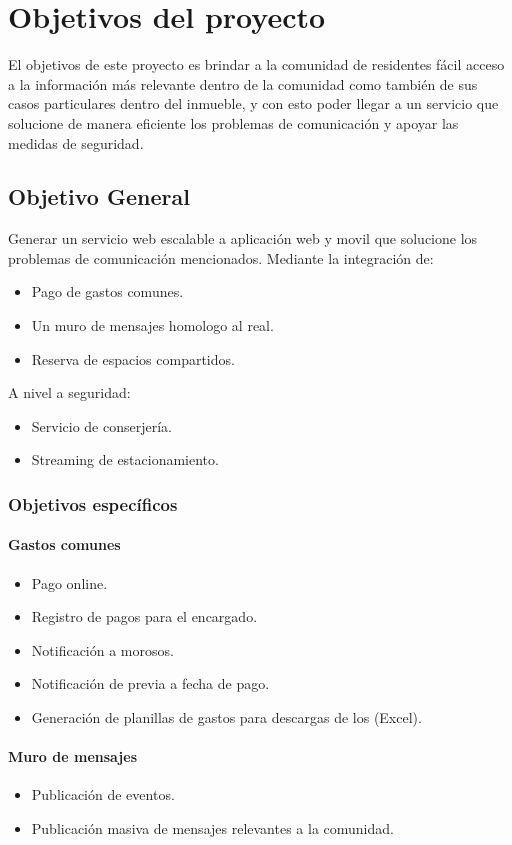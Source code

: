 \chapter{Objetivos del proyecto}
\label{chap:goals}
El objetivos de este proyecto es brindar a la comunidad de residentes fácil acceso a la información más relevante dentro de la comunidad como también de sus casos particulares dentro del inmueble, y con esto poder llegar a un servicio que solucione de manera eficiente los problemas de comunicación y apoyar las medidas de seguridad.

\section{Objetivo General}
Generar un servicio web escalable a aplicación web y movil que solucione los problemas de comunicación mencionados. Mediante la integración de:
\begin{itemize}
\item Pago de gastos comunes.
\item Un muro de mensajes homologo al real.
\item Reserva de espacios compartidos.
\end{itemize}
A nivel a seguridad:
\begin{itemize}
	\item Servicio de conserjería.
	\item Streaming de estacionamiento.
\end{itemize}

\subsection{Objetivos específicos}
\subsubsection{Gastos comunes}
\begin{itemize}
	\item Pago online.
	\item Registro de pagos para el encargado.
	\item Notificación a morosos.
	\item Notificación de previa a fecha de pago.
	\item Generación de planillas de gastos para descargas de los  (Excel).
\end{itemize}
\subsubsection{Muro de mensajes}
\begin{itemize}
	\item Publicación de eventos.
	\item Publicación masiva de mensajes relevantes a la comunidad.
\end{itemize}
